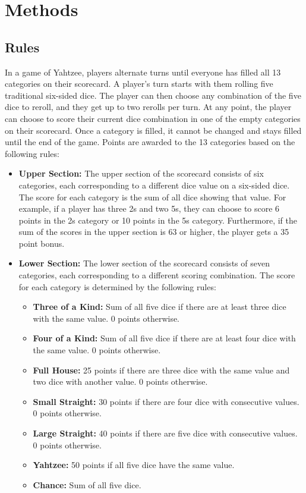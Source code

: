 \documentclass[12pt]{article}
\begin{document}
\section{Methods}

\subsection{Rules}

In a game of Yahtzee, players alternate turns until everyone has filled all 13 categories on their scorecard. A player's turn starts with them rolling five traditional six-sided dice. The player can then choose any combination of the five dice to reroll, and they get up to two rerolls per turn. At any point, the player can choose to score their current dice combination in one of the empty categories on their scorecard. Once a category is filled, it cannot be changed and stays filled until the end of the game. Points are awarded to the 13 categories based on the following rules:

\begin{itemize}
    \item \textbf{Upper Section:} The upper section of the scorecard consists of six categories, each corresponding to a different dice value on a six-sided dice. The score for each category is the sum of all dice showing that value. For example, if a player has three 2s and two 5s, they can choose to score 6 points in the 2s category or 10 points in the 5s category. Furthermore, if the sum of the scores in the upper section is 63 or higher, the player gets a 35 point bonus.
    \item \textbf{Lower Section:} The lower section of the scorecard consists of seven categories, each corresponding to a different scoring combination. The score for each category is determined by the following rules:
    \begin{itemize}
        \item \textbf{Three of a Kind:} Sum of all five dice if there are at least three dice with the same value. 0 points otherwise.
        \item \textbf{Four of a Kind:} Sum of all five dice if there are at least four dice with the same value. 0 points otherwise.
        \item \textbf{Full House:} 25 points if there are three dice with the same value and two dice with another value. 0 points otherwise.
        \item \textbf{Small Straight:} 30 points if there are four dice with consecutive values. 0 points otherwise.
        \item \textbf{Large Straight:} 40 points if there are five dice with consecutive values. 0 points otherwise.
        \item \textbf{Yahtzee:} 50 points if all five dice have the same value.
        \item \textbf{Chance:} Sum of all five dice.
    \end{itemize}
\end{itemize}
\end{document}
